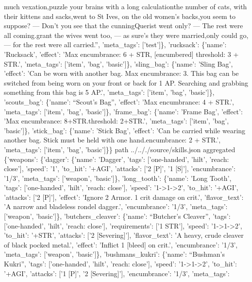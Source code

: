 \documentclass[
  letterpaper,
  DIV=11,
  numbers=noendperiod]{scrartcl}
\begin{document}
{much vexation,\nAnd puzzle your brains with a long calculation\nOf the
number of cats, with their kittens and sacks,\nWhich went to St Ives, on
the old women's backs,\nAs you seem to suppose? --- Don't you see that
the cunning\nOld Querist went only? --- The rest were all
coming.\nBut grant the wives went too, --- as sure's they were
married,\nEight only could go, --- for the rest were all carried.'',
'meta\_tags': {[}'test'{]}\}, 'rucksack': \{'name': 'Rucksack',
'effect': 'Max encumbrance: 6 + STR, {[}encumbered{]} threshold: 3 +
STR.', 'meta\_tags': {[}'item', 'bag', 'basic'{]}\}, 'sling\_bag':
\{'name': 'Sling Bag', 'effect': 'Can be worn with another bag. Max
encumbrance: 3. This bag can be switched from being worn on your front
or back for 1 AP. Searching and grabbing something from this bag is 5
AP.', 'meta\_tags': {[}'item', 'bag', 'basic'{]}\}, 'scouts\_bag':
\{'name': ``Scout's Bag'', 'effect': 'Max encumbrance: 4 + STR.',
'meta\_tags': {[}'item', 'bag', 'basic'{]}\}, 'frame\_bag': \{'name':
'Frame Bag', 'effect': 'Max encumbrance: 8+STR.\n[encumbered] threshold:
2+STR.', 'meta\_tags': {[}'item', 'bag', 'basic'{]}\}, 'stick\_bag':
\{'name': 'Stick Bag', 'effect': 'Can be carried while wearing another
bag. Stick must be held with one hand.\nMax encumbrance: 2 + STR.',
'meta\_tags': {[}'item', 'bag', 'basic'{]}\}\} path
../.././source/skills.json aggregated \{'weapons': \{'dagger': \{'name':
'Dagger', 'tags': {[}'one-handed', 'hilt', 'reach: close'{]}, 'speed':
'1', 'to\_hit': '+AGI', 'attacks': {[}'2 {[}P{]}', '1 {[}S{]}'{]},
'encumbrance': '1/3', 'meta\_tags': {[}'weapon', 'basic'{]}\},
'long\_tooth': \{'name': 'Long Tooth', 'tags': {[}'one-handed', 'hilt',
'reach: close'{]}, 'speed': '1-\textgreater1-\textgreater2', 'to\_hit':
'+AGI', 'attacks': {[}'2 {[}P{]}'{]}, 'effect': 'Ignore 2 Armor. 1 crit
damage on crit.', 'flavor\_text': 'A narrow and bladeless rondel
dagger.', 'encumbrance': '1/3', 'meta\_tags': {[}'weapon', 'basic'{]}\},
'butchers\_cleaver': \{'name': ``Butcher's Cleaver'', 'tags':
{[}'one-handed', 'hilt', 'reach: close'{]}, 'requirements': {[}'1
STR'{]}, 'speed': '1-\textgreater1-\textgreater2', 'to\_hit': '+STR',
'attacks': {[}'2 {[}Severing{]}'{]}, 'flavor\_text': 'A heavy, crude
cleaver of black pocked metal.', 'effect': 'Inflict 1 {[}bleed{]} on
crit.', 'encumbrance': '1/3', 'meta\_tags': {[}'weapon', 'basic'{]}\},
'bushmans\_kukri': \{'name': ``Bushman's Kukri'', 'tags':
{[}'one-handed', 'hilt', 'reach: close'{]}, 'speed':
'1-\textgreater1-\textgreater2', 'to\_hit': '+AGI', 'attacks': {[}'1
{[}P{]}', '2 {[}Severing{]}'{]}, 'encumbrance': '1/3', 'meta\_tags':
}
\end{document}
